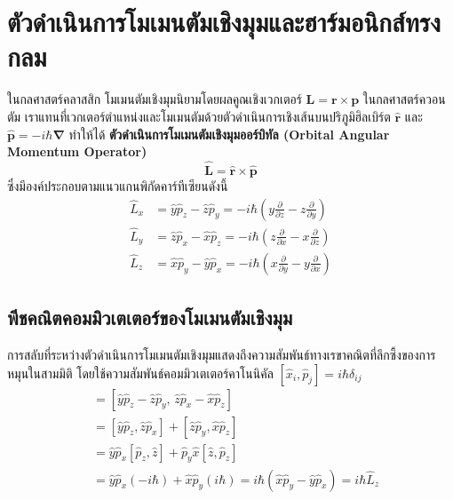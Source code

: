 \section{ตัวดำเนินการโมเมนตัมเชิงมุมและฮาร์มอนิกส์ทรงกลม}

ในกลศาสตร์คลาสสิก โมเมนตัมเชิงมุมนิยามโดยผลคูณเชิงเวกเตอร์ $\mathbf{L} = \mathbf{r} \times \mathbf{p}$ ในกลศาสตร์ควอนตัม เราแทนที่เวกเตอร์ตำแหน่งและโมเมนตัมด้วยตัวดำเนินการเชิงเส้นบนปริภูมิฮิลเบิร์ต $\hat{\mathbf{r}}$ และ $\hat{\mathbf{p}} = -i\hbar\boldsymbol{\nabla}$ ทำให้ได้ \textbf{ตัวดำเนินการโมเมนตัมเชิงมุมออร์บิทัล (Orbital Angular Momentum Operator)}
\begin{equation}
\hat{\mathbf{L}} = \hat{\mathbf{r}} \times \hat{\mathbf{p}}
\end{equation}
ซึ่งมีองค์ประกอบตามแนวแกนพิกัดคาร์ทีเซียนดังนี้
\begin{align}
\hat{L}_x &= \hat{y}\hat{p}_z - \hat{z}\hat{p}_y = -i\hbar\left( y\frac{\partial}{\partial z} - z\frac{\partial}{\partial y} \right) \\
\hat{L}_y &= \hat{z}\hat{p}_x - \hat{x}\hat{p}_z = -i\hbar\left( z\frac{\partial}{\partial x} - x\frac{\partial}{\partial z} \right) \\
\hat{L}_z &= \hat{x}\hat{p}_y - \hat{y}\hat{p}_x = -i\hbar\left( x\frac{\partial}{\partial y} - y\frac{\partial}{\partial x} \right)
\end{align}

\subsection{พีชคณิตคอมมิวเตเตอร์ของโมเมนตัมเชิงมุม}
การสลับที่ระหว่างตัวดำเนินการโมเมนตัมเชิงมุมแสดงถึงความสัมพันธ์ทางเรขาคณิตที่ลึกซึ้งของการหมุนในสามมิติ โดยใช้ความสัมพันธ์คอมมิวเตเตอร์คาโนนิคัล $[\hat{x}_i, \hat{p}_j] = i\hbar\delta_{ij}$
\begin{align*}
[\hat{L}_x, \hat{L}_y] &= [\hat{y}\hat{p}_z - \hat{z}\hat{p}_y, \, \hat{z}\hat{p}_x - \hat{x}\hat{p}_z] \\
&= [\hat{y}\hat{p}_z, \hat{z}\hat{p}_x] + [\hat{z}\hat{p}_y, \hat{x}\hat{p}_z] \\
&= \hat{y}\hat{p}_x [\hat{p}_z, \hat{z}] + \hat{p}_y\hat{x} [\hat{z}, \hat{p}_z] \\
&= \hat{y}\hat{p}_x (-i\hbar) + \hat{x}\hat{p}_y (i\hbar) = i\hbar(\hat{x}\hat{p}_y - \hat{y}\hat{p}_x) = i\hbar \hat{L}_z
\end{align*}

